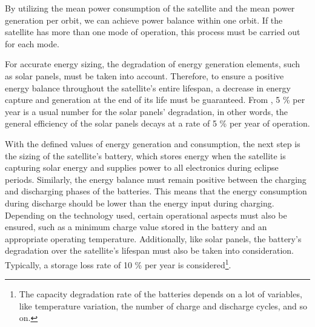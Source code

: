 By utilizing the mean power consumption of the satellite and the mean power generation per orbit, we can achieve power balance within one orbit. If the satellite has more than one mode of operation, this process must be carried out for each mode.


For accurate energy sizing, the degradation of energy generation elements, such as solar panels, must be taken into account. Therefore, to ensure a positive energy balance throughout the satellite's entire lifespan, a decrease in energy capture and generation at the end of its life must be guaranteed. From \cite{larson2005}, 5 \% per year is a usual number for the solar panels’ degradation, in other words, the general efficiency of the solar panels decays at a rate of 5 \% per year of operation.


With the defined values of energy generation and consumption, the next step is the sizing of the satellite's battery, which stores energy when the satellite is capturing solar energy and supplies power to all electronics during eclipse periods. Similarly, the energy balance must remain positive between the charging and discharging phases of the batteries. This means that the energy consumption during discharge should be lower than the energy input during charging. Depending on the technology used, certain operational aspects must also be ensured, such as a minimum charge value stored in the battery and an appropriate operating temperature. Additionally, like solar panels, the battery's degradation over the satellite's lifespan must also be taken into consideration. Typically, a storage loss rate of 10 \% per year is considered\footnote{The capacity degradation rate of the batteries depends on a lot of variables, like temperature variation, the number of charge and discharge cycles, and so on.}.

